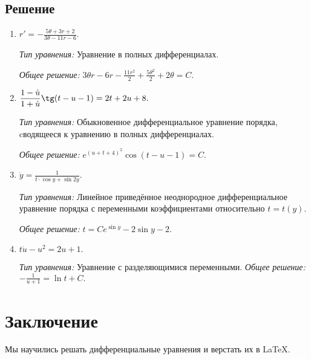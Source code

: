 \documentclass[14pt, a4paper, titlepage, fleqn]{extarticle}
\newcommand{\rnc}[1]
    {\MakeUppercase{\romannumeral #1}}
\begin{document}
        \subsection{Решение}
            \begin{enumerate}
                \item 
                \(
                    \displaystyle
                    r' = -\frac{5\theta + 3r + 2}{3\theta -11r-6}. 
                \)

                \textit{Тип уравнения:}
                Уравнение в полных дифференциалах.

                \textit{Общее решение:}
                \(
                    \displaystyle
                    3 \theta r-6r-\frac{11r^2}{2}+\frac{5\theta^2}{2}+2\theta=C.
                \)

                \item 
                \(
                    \displaystyle
                    \frac{1-\dot{u}}{1+\dot{u}} \tg (t-u-1) = 2t+2u+8.
                \)

                \textit{Тип уравнения:}
                Обыкновенное дифференциальное уравнение \rnc{1} порядка,
                cводящееся к уравнению в полных дифференциалах.

                \textit{Общее решение:}
                \(
                    \displaystyle
                    e^{(u+t+4)^2} \cos(t-u-1) = C.
                \)

                \pagebreak
                \item 
                \(
                    \displaystyle
                    \dot{y} = \frac{1}{t \cdot \cos{y} + \sin{2y}}.
                \)

                \textit{Тип уравнения:}
                Линейное приведённое неоднородное дифференциальное уравнение 
                \rnc{1} порядка с переменными коэффициентами относительно
                \(t = t(y)\).

                \textit{Общее решение:}
                \(
                    \displaystyle
                    t = C e^{\sin{y}} - 2 \sin{y}-2.
                \)
                
                \item 
                \(
                    \displaystyle
                    t\dot{u} - u^2=2u+1.
                \)

                \textit{Тип уравнения:} Уравнение с разделяющимися переменными.
                \textit{Общее решение:}
                \(
                    \displaystyle
                    -\frac{1}{u+1}=\ln{t}+C.
                \)
            \end{enumerate}

    \pagebreak

    \section{Заключение}
        Мы научились решать дифференциальные 
        уравнения и верстать их в \LaTeX.
\end{document}
